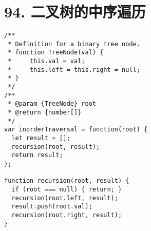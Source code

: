 \newpage
\section{94. 二叉树的中序遍历}
\label{leetcode:94}

\begin{verbatim}
/**
 * Definition for a binary tree node.
 * function TreeNode(val) {
 *     this.val = val;
 *     this.left = this.right = null;
 * }
 */
/**
 * @param {TreeNode} root
 * @return {number[]}
 */
var inorderTraversal = function(root) {
  let result = [];
  recursion(root, result);
  return result;
};

function recursion(root, result) {
  if (root === null) { return; }
  recursion(root.left, result);
  result.push(root.val);
  recursion(root.right, result);
}
\end{verbatim}